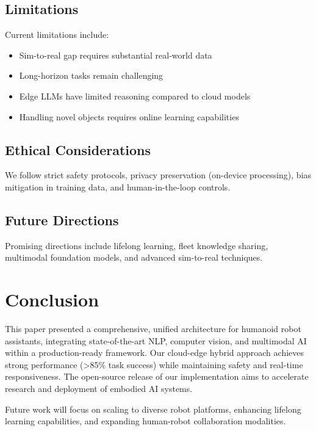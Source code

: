 \documentclass[conference]{IEEEtran}
\begin{document}
\subsection{Limitations}

Current limitations include:
\begin{itemize}
    \item Sim-to-real gap requires substantial real-world data
    \item Long-horizon tasks remain challenging
    \item Edge LLMs have limited reasoning compared to cloud models
    \item Handling novel objects requires online learning capabilities
\end{itemize}

\subsection{Ethical Considerations}

We follow strict safety protocols, privacy preservation (on-device processing), bias mitigation in training data, and human-in-the-loop controls.

\subsection{Future Directions}

Promising directions include lifelong learning, fleet knowledge sharing, multimodal foundation models, and advanced sim-to-real techniques.

\section{Conclusion}
\label{sec:conclusion}

This paper presented a comprehensive, unified architecture for humanoid robot assistants, integrating state-of-the-art NLP, computer vision, and multimodal AI within a production-ready framework. Our cloud-edge hybrid approach achieves strong performance (>85\% task success) while maintaining safety and real-time responsiveness. The open-source release of our implementation aims to accelerate research and deployment of embodied AI systems.

Future work will focus on scaling to diverse robot platforms, enhancing lifelong learning capabilities, and expanding human-robot collaboration modalities.
\end{document}
